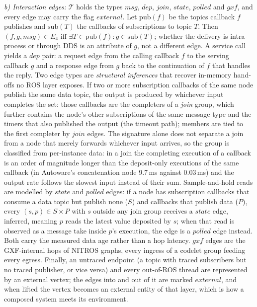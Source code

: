 \emph{b) Interaction edges:} $\mathcal{T}$ holds the types
$\mathit{msg}$, $\mathit{dep}$, $\mathit{join}$, $\mathit{state}$,
$\mathit{polled}$ and $\mathit{gxf}$, and every edge may carry the flag
$\mathit{external}$.
Let $\mathrm{pub}(f)$ be the topics callback $f$ publishes and
$\mathrm{sub}(T)$ the callbacks of subscriptions to topic $T$. Then
$(f,g,\mathit{msg})\in E_4$ iff $\exists T\in\mathrm{pub}(f):g\in\mathrm{sub}(T)$;
whether the delivery is intra-process or through DDS is an attribute of
$g$, not a different edge. A service call yields a $\mathit{dep}$ pair:
a request edge from the calling callback $f$ to the serving callback $g$
and a response edge from $g$ back to the continuation of $f$ that
handles the reply. Two edge types are \emph{structural inferences} that
recover in-memory hand-offs no ROS layer exposes. If two or more
subscription callbacks of the same node publish the same data topic,
the output is produced by whichever input completes the set: those
callbacks are the completers of a \emph{join} group, which further
contains the node's other subscriptions of the same message type and
the timers that also published the output (the timeout path); members
are tied to the first completer by $\mathit{join}$ edges. The signature
alone does not separate a join from a node that merely forwards whichever
input arrives, so the group is classified from per-instance data: in a
join the completing execution of a callback is an order of magnitude
longer than the deposit-only executions of the same callback (in
Autoware's concatenation node 9.7\,ms against 0.03\,ms) and the output
rate follows the slowest input instead of their sum. Sample-and-hold reads are modelled by $\mathit{state}$ and
$\mathit{polled}$ edges: if a node has subscription callbacks that
consume a data topic but publish none ($S$) and callbacks that publish
data ($P$), every $(s,p)\in S\times P$ with $s$ outside any join group
receives a $\mathit{state}$ edge, inferred, meaning $p$ reads the latest
value deposited by $s$; when that read is observed as a message take
inside $p$'s execution, the edge is a $\mathit{polled}$ edge instead.
Both carry the measured data age rather than a hop latency. $\mathit{gxf}$ edges are the GXF-internal hops of NITROS
graphs, every ingress of a codelet group feeding every egress. Finally,
an untraced endpoint (a topic with traced subscribers but no traced
publisher, or vice versa) and every out-of-ROS thread are represented
by an external vertex; the edges into and out of it are marked
$\mathit{external}$, and when lifted the vertex becomes an external
entity of that layer, which is how a composed system meets its
environment.

